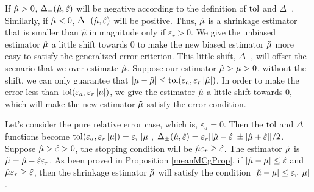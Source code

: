 \documentclass{iitthesis}
\theoremstyle{definition}
\begin{document}
If $\hat{\mu} >0$, $\Delta_{-}(\hat{\mu},\hat{\varepsilon})$ will be negative according to the definition of $\operatorname{tol}$ and $\Delta_{-}$. Similarly, if $\hat{\mu} <0$, $\Delta_{-}(\hat{\mu},\hat{\varepsilon})$ will be positive. Thus, $\tilde{\mu}$ is a shrinkage estimator that is smaller than $\hat{\mu}$ in magnitude only if $\varepsilon_r > 0$. We give the unbiased estimator $\hat{\mu}$ a little shift towards 0 to make the new biased estimator $\tilde{\mu}$ more easy to satisfy the generalized error criterion. This little shift, $\Delta_-$, will offset the scenario that we over estimate $\hat{\mu}$. Suppose our estimator $\hat{\mu}>\mu>0$, without the shift, we can only guarantee that $\left \lvert \mu-\hat{\mu} \right \rvert\leq \operatorname{tol}(\varepsilon_a,\varepsilon_r\left \lvert \hat{\mu} \right \rvert)$. In order to make the error less than $\operatorname{tol}(\varepsilon_a,\varepsilon_r\left \lvert \mu \right \rvert)$, we give the estimator $\hat{\mu}$ a little shift towards 0, which will make the new estimator $\tilde{\mu}$ satisfy the error condition.

Let's consider the pure relative error case, which is, $\varepsilon_a=0$. Then the $\operatorname{tol}$ and $\Delta$ functions become $\operatorname{tol}(\varepsilon_a,\varepsilon_r\left \lvert \mu \right \rvert) = \varepsilon_r\left \lvert \mu \right \rvert$, $\Delta_{\pm}(\hat{\mu},\hat{\varepsilon}) = \varepsilon_r [ |\hat{\mu}-\hat{\varepsilon}| \pm |\hat{\mu}+\hat{\varepsilon}|]/2$. 
Suppose $\hat{\mu}>\hat{\varepsilon}>0$, the stopping condition will be $\hat{\mu}\varepsilon_r\geq \hat{\varepsilon}$. The estimator $\tilde{\mu}$ is $\tilde{\mu} = \hat{\mu}-\hat{\varepsilon}\varepsilon_r$.  As been proved in Proposition \ref{meanMCgProp}, if $\left \lvert \hat{\mu}-\mu \right \rvert\leq \hat{\varepsilon}$ and $\hat{\mu}\varepsilon_r\geq \hat{\varepsilon}$, then the shrinkage estimator $\tilde{\mu}$ will satisfy the condition $\left \lvert \tilde{\mu} -\mu \right \rvert \leq \varepsilon_r\left \lvert \mu \right \rvert$. 

\label{sec:algmeanMCg}
\end{document}
